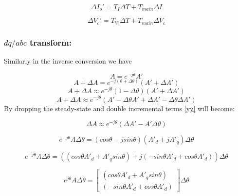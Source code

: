 \begin{equation}\label{}
\Delta I_o'= T_I \Delta T+  T_{main} \Delta I
\end{equation}

\begin{equation}\label{}
\Delta V_c'= T_V_c \Delta T+  T_{main} \Delta V_c
\end{equation}

\subsubsection{$dq/abc$ transform:} Similarly in the inverse conversion we have

\begin{equation}\label{}
A=e^{-j\theta}A'
\end{equation}
\begin{equation}\label{}
A+\Delta A=e^{-j(\theta+\Delta \theta)}(A'+\Delta A')
\end{equation}
\begin{equation}\label{}
A+\Delta A\approx e^{-j\theta}(1-\Delta \theta)(A'+\Delta A')
\end{equation}
\begin{equation}\label{yy}
A+\Delta A\approx e^{-j\theta}(A'-\Delta \theta A'+\Delta A' - \Delta \theta \Delta A')
\end{equation}
By dropping the steady-state and double incremental terms \ref{yy} will become:





\begin{equation}\label{}
\Delta A\approx e^{-j\theta}( \Delta A' - A' \Delta \theta)
\end{equation}

\begin{equation}\label{}
e^{-j\theta} A \Delta \theta= (cos\theta-j sin\theta) (A'_d+j A'_q) \Delta \theta
\end{equation}

\begin{equation}\label{}
e^{-j\theta} A \Delta \theta= ((cos\theta A'_d + A'_q sin\theta) + j (-sin\theta A'_d+ cos\theta A'_d)) \Delta \theta
\end{equation}

\begin{equation}\label{}
e^{j\theta} A \Delta \theta=\begin{bmatrix} (cos\theta A'_d + A'_q sin\theta) \\ (-sin\theta A'_d+ cos\theta A'_d) \end{bmatrix}\Delta \theta
\end{equation}

